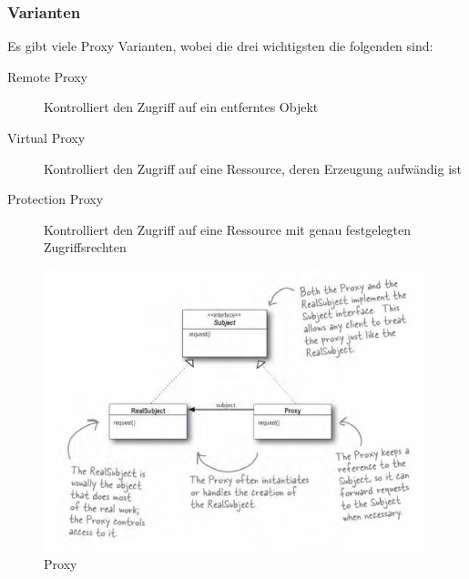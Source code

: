 \subsubsection{Varianten}
Es gibt viele Proxy Varianten, wobei die drei wichtigsten die folgenden sind:
\begin{description}
	\item[Remote Proxy] Kontrolliert den Zugriff auf ein entferntes Objekt
	\item[Virtual Proxy] Kontrolliert den Zugriff auf eine Ressource, deren Erzeugung aufwändig ist
	\item[Protection Proxy] Kontrolliert den Zugriff auf eine Ressource mit genau festgelegten Zugriffsrechten
\end{description}

\begin{figure}[h]
	\centering
	\includegraphics[width=0.9\linewidth]{images/proxy_pattern.png}
	\caption{Proxy}
	\label{fig:proxypattern}
\end{figure}

\clearpage

